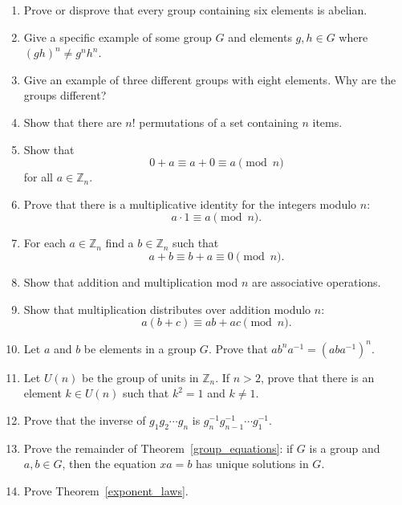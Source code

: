 {\begin{enumerate}
 
\item
Prove or disprove that every group containing six elements is abelian.
 
 
\item
Give a specific example of some group $G$ and elements $g, h \in G$
where $(gh)^n \neq g^nh^n$. 
 
 
\item %
Give an example of three different groups with eight elements.  Why
are the groups different? 
 
 
\item
Show that there are $n!$ permutations of a set containing $n$ items. 
 
 
\item
Show that 
\[
0 + a  \equiv a + 0  \equiv a \pmod{ n }
\]
for all $a \in {\mathbb Z}_n$.
 
 
\item
Prove that there is  a multiplicative identity for the integers modulo
$n$: 
\[
a \cdot  1   \equiv  a \pmod{ n}.
\]
 
 
\item
For each $a \in {\mathbb Z}_n$ find a $b \in {\mathbb Z}_n$ such that
\[
a+b \equiv b+a  \equiv 0 \pmod{ n}.
\]
 
 
\item
Show that addition and multiplication mod $n$ are associative
operations. 
 
 
\item
Show that multiplication distributes over addition modulo $n$:
\[
a  (b  + c)  \equiv a  b + a  c  \pmod{ n}.
\]
 
 
\item
Let $a$ and $b$ be elements in a group $G$.  Prove that $ab^na^{-1} =
(aba^{-1})^n$. 
 
 
\item
Let $U(n)$ be the group of units in ${\mathbb Z}_n$. If $n>2$, prove that
there is an element $k \in U(n)$ such that $k^2 = 1$ and $k \neq 1$.
 
 
\item
Prove that the inverse of $g _1 g_2 \cdots g_n$ is $g_n^{-1}
g_{n-1}^{-1} \cdots g_1^{-1}$. 
 
 
\item
Prove the remainder of Theorem~\ref{group_equations}: if $G$ is a group and $a, b \in G$, then
the equation $xa = b$ has unique solutions in $G$. 
 
\item
Prove Theorem~\ref{exponent_laws}.
 

\end{enumerate}}
